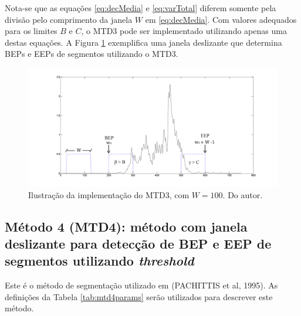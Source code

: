 \documentclass[
	12pt,				%
	openright,			%
	oneside,
	a4paper,			%
	english,			%
	francais,			%
	spanish,			%
	brazil				%
	]{abntex2}
\begin{document}
	Nota-se que as equações \ref{eq:decMedia} e \ref{eq:varTotal} diferem somente pela divisão pelo comprimento da janela $W$ em \ref{eq:decMedia}. Com valores adequados para os limites $B$ e $C$, o MTD3 pode ser implementado utilizando apenas uma destas equações. A Figura \ref{fig:mtd3example} exemplifica uma janela deslizante que determina BEPs e EEPs de segmentos utilizando o MTD3.
	
\begin{figure}
\centering
\includegraphics[width=\linewidth]{./img/mtd3ex.png}
\caption{Ilustração da implementação do MTD3, com $W = 100$. Do autor.}
\label{fig:mtd3example}
\end{figure}
	
\subsection{Método 4 (MTD4): método com janela deslizante para detecção de BEP e EEP de segmentos utilizando \emph{threshold}}

Este é o método de segmentação utilizado em (PACHITTIS et al, 1995). As definições da Tabela \ref{tab:mtd4params} serão utilizados para descrever este método.
	
\begin{table}[htb]
\end{table}
	
\end{document}
